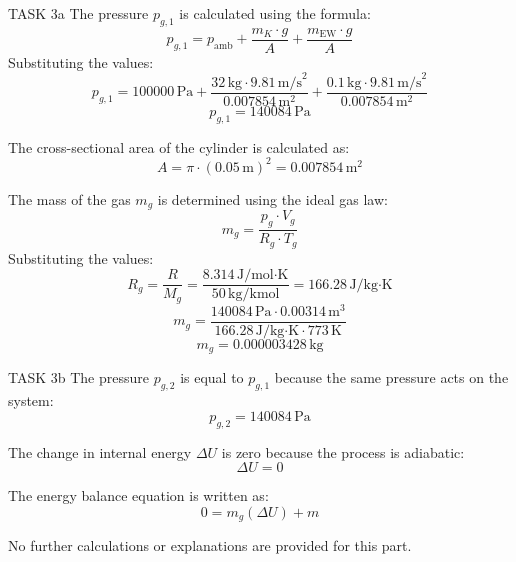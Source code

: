 TASK 3a  
The pressure \( p_{g,1} \) is calculated using the formula:  
\[
p_{g,1} = p_{\text{amb}} + \frac{m_K \cdot g}{A} + \frac{m_{\text{EW}} \cdot g}{A}
\]  
Substituting the values:  
\[
p_{g,1} = 100000 \, \text{Pa} + \frac{32 \, \text{kg} \cdot 9.81 \, \text{m/s}^2}{0.007854 \, \text{m}^2} + \frac{0.1 \, \text{kg} \cdot 9.81 \, \text{m/s}^2}{0.007854 \, \text{m}^2}
\]  
\[
p_{g,1} = 140084 \, \text{Pa}
\]  

The cross-sectional area of the cylinder is calculated as:  
\[
A = \pi \cdot (0.05 \, \text{m})^2 = 0.007854 \, \text{m}^2
\]  

The mass of the gas \( m_g \) is determined using the ideal gas law:  
\[
m_g = \frac{p_g \cdot V_g}{R_g \cdot T_g}
\]  
Substituting the values:  
\[
R_g = \frac{R}{M_g} = \frac{8.314 \, \text{J/mol·K}}{50 \, \text{kg/kmol}} = 166.28 \, \text{J/kg·K}
\]  
\[
m_g = \frac{140084 \, \text{Pa} \cdot 0.00314 \, \text{m}^3}{166.28 \, \text{J/kg·K} \cdot 773 \, \text{K}}
\]  
\[
m_g = 0.000003428 \, \text{kg}
\]  

TASK 3b  
The pressure \( p_{g,2} \) is equal to \( p_{g,1} \) because the same pressure acts on the system:  
\[
p_{g,2} = 140084 \, \text{Pa}
\]  

The change in internal energy \( \Delta U \) is zero because the process is adiabatic:  
\[
\Delta U = 0
\]  

The energy balance equation is written as:  
\[
0 = m_g (\Delta U) + m
\]  

No further calculations or explanations are provided for this part.